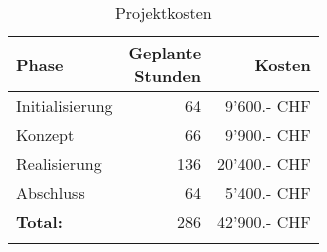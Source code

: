 \begin{longtable}[]{@{}lrr@{}}
  \toprule
  \textbf{Phase}  & \makecell[r]{\textbf{Geplante} \\\textbf{Stunden}} & \textbf{Kosten}\tabularnewline
  \midrule
  \endhead
  Initialisierung &  64                       &  9'600.- CHF\tabularnewline
  Konzept         &  66                       &  9'900.- CHF\tabularnewline
  Realisierung    & 136                       & 20'400.- CHF\tabularnewline
  Abschluss       &  64                       &  5'400.- CHF\tabularnewline
  \midrule
  \textbf{Total:} & 286                       & 42'900.- CHF\tabularnewline
  \bottomrule
  \caption{Projektkosten}
\end{longtable}
